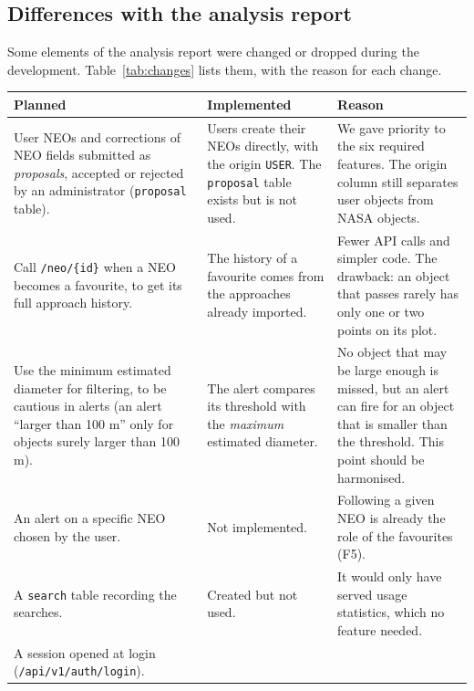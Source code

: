 \subsection{Differences with the analysis report}

Some elements of the analysis report were changed or dropped during the development.
Table~\ref{tab:changes} lists them, with the reason for each change.

\begin{table}[H]
  \centering
  \small
  \begin{tabularx}{\textwidth}{@{}>{\raggedright\arraybackslash}X>{\raggedright\arraybackslash}X>{\raggedright\arraybackslash}X@{}}
    \toprule
    \textbf{Planned} & \textbf{Implemented} & \textbf{Reason} \\
    \midrule
    User NEOs and corrections of NEO fields submitted as \emph{proposals}, accepted or rejected
      by an administrator (\texttt{proposal} table). &
    Users create their NEOs directly, with the origin \texttt{USER}. The \texttt{proposal} table
      exists but is not used. &
    We gave priority to the six required features. The origin column still separates user
      objects from NASA objects. \\
    \addlinespace
    Call \texttt{/neo/\{id\}} when a NEO becomes a favourite, to get its full approach history. &
    The history of a favourite comes from the approaches already imported. &
    Fewer API calls and simpler code. The drawback: an object that passes rarely has only one or
      two points on its plot. \\
    \addlinespace
    Use the minimum estimated diameter for filtering, to be cautious in alerts (an alert ``larger
      than 100 m'' only for objects surely larger than 100 m). &
    The alert compares its threshold with the \emph{maximum} estimated diameter. &
    No object that may be large enough is missed, but an alert can fire for an object that is
      smaller than the threshold. This point should be harmonised. \\
    \addlinespace
    An alert on a specific NEO chosen by the user. &
    Not implemented. &
    Following a given NEO is already the role of the favourites (F5). \\
    \addlinespace
    A \texttt{search} table recording the searches. &
    Created but not used. &
    It would only have served usage statistics, which no feature needed. \\
    \addlinespace
    A session opened at login (\texttt{/api/v1/auth/login}). &

\end{tabularx}
\end{table}

